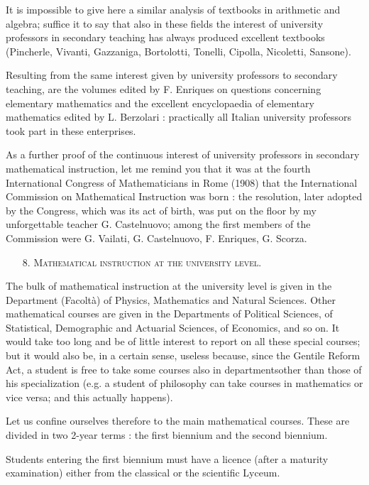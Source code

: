 It is impossible to give here a similar analysis of textbooks in arithmetic and algebra; suffice it to say that also in these fields the interest of university professors in secondary teaching has always produced excellent textbooks (Pincherle, Vivanti, Gazzaniga, Bortolotti, Tonelli, Cipolla, Nicoletti, Sansone).

Resulting from the same interest given by university professors to secondary teaching, are the volumes edited by F. Enriques on questions concerning elementary mathematics and the excellent encyclopaedia of elementary mathematics edited by L. Berzolari : practically all Italian university professors took part in these enterprises.

As a further proof of the continuous interest of university professors in secondary mathematical instruction, let me remind you that it was at the fourth International Congress of Mathematicians in Rome (1908) that the International Commission on Mathematical Instruction was born : the resolution, later adopted by the Congress, which was its act of birth, was put on the floor by my unforgettable teacher G. Castelnuovo; among the first members of the Commission were G. Vailati, G. Castelnuovo, F. Enriques, G. Scorza.

\begin{itemize}
\item[8.] \textsc{Mathematical instruction at the university level.}
\end{itemize}

The bulk of mathematical instruction at the university level is given in the Department (Facolt\`a) of Physics, Mathematics and Natural Sciences. Other mathematical courses are given in the Departments of Political Sciences, of Statistical, Demographic and Actuarial Sciences, of Economics, and so on. It would take too long and be of little interest to report on all these special courses; but it would also be, in a certain sense, useless because, since the Gentile Reform Act, a student is free to take some courses also in departments\pageoriginale other than those of his specialization (e.g. a student of philosophy can take courses in mathematics or vice versa; and this actually happens).

Let us confine ourselves therefore to the main mathematical courses. These are divided in two 2-year terms : the first biennium and the second biennium.

Students entering the first biennium must have a licence (after a maturity examination) either from the classical or the scientific Lyceum.

